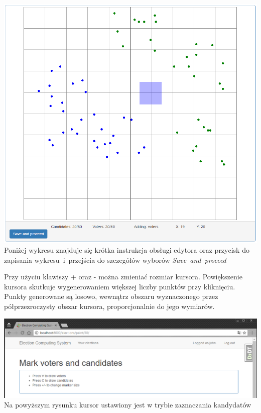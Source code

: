 \documentclass[pdflatex,11pt]{../aghdoc_version2}
\begin{document}
\begin{center}
\includegraphics[width=1.0\textwidth]{pics/paint_2.png}
Poniżej wykresu znajduje się krótka 
instrukcja obsługi edytora oraz przycisk do zapisania \mbox{wykresu i przejścia} do szczegółów wyborów
\mbox{\textit{Save and proceed}}
\end{center}

\newpage
Przy użyciu klawiszy + oraz - można zmieniać rozmiar kursora. 
Powiększenie kursora skutkuje wygenerowaniem większej liczby punktów przy kliknięciu.
Punkty generowane są losowo, wewnątrz obszaru wyznaczonego przez półprzezroczysty obszar kursora, 
proporcjonalnie do jego wymiarów.

\begin{center}
\includegraphics[width=1.0\textwidth]{pics/paint_1.png}
 Na powyższym rysunku 
kursor ustawiony jest w trybie zaznaczania kandydatów
\end{center}
\end{document}
